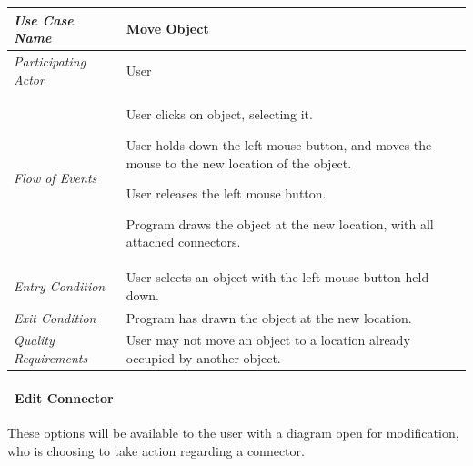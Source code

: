 \documentclass[twoside,letterpaper]{article}
\newenvironment{my_enumerate}{
\begin{enumerate}
  \setlength{\itemsep}{1pt}
  \setlength{\parskip}{0pt}
  \setlength{\parsep}{0pt}}{\end{enumerate}
}
\begin{document}
\begin{flushleft}
\tablehead{}
\begin{tabular}{|m{2.0in} m{5.0in}|}
\hline
{\bfseries\emph{Use Case Name}}
& {\bfseries Move Object}
\\\hline
\emph{Participating Actor}
& User
\\\hline
\emph{Flow of Events}
& \begin{my_enumerate}
\item User clicks on object, selecting it.
\item User holds down the left mouse button, and moves the mouse to the new location of the object.
\item User releases the left mouse button.
\item Program draws the object at the new location, with all attached connectors. 
\end{my_enumerate}
\\\hline
\emph{Entry Condition}
& User selects an object with the left mouse button held down.
\\\hline
\emph{Exit Condition}
& Program has drawn the object at the new location.
\\\hline
\emph{Quality Requirements}
& User may not move an object to a location already occupied by another object. 
\\\hline
\end{tabular}
\end{flushleft}
\bigskip


\clearpage

\paragraph[\ Use Category]
{\ Edit Connector} {These options will be available to the user with a diagram open for modification, who is choosing to take action regarding a connector.}
\end{document}
